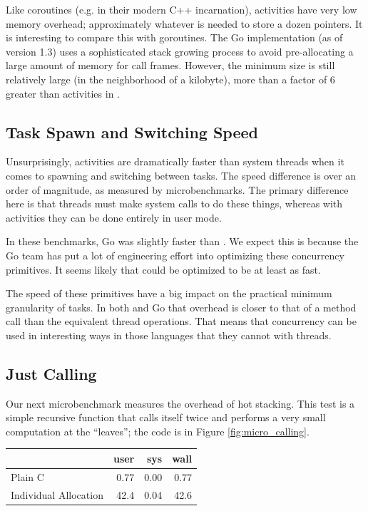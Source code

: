 \documentclass[acmsmall,anonymous,review]{acmart}\settopmatter{printfolios=true,printccs=false,printacmref=false}
\begin{document}
Like coroutines (e.g. in their modern C++ incarnation), activities have very low memory overhead; approximately whatever is needed to store a dozen pointers.
It is interesting to compare this with goroutines.
The Go implementation (as of version 1.3) uses a sophisticated stack growing process to avoid pre-allocating a large amount of memory for call frames.
However, the minimum size is still relatively large (in the neighborhood of a kilobyte), more than a factor of 6 greater than activities in \charcoal{}.

\subsection{Task Spawn and Switching Speed}

Unsurprisingly, activities are dramatically faster than system threads when it comes to spawning and switching between tasks.
The speed difference is over an order of magnitude, as measured by microbenchmarks.
The primary difference here is that threads must make system calls to do these things, whereas with activities they can be done entirely in user mode.

In these benchmarks, Go was slightly faster than \charcoal{}.
We expect this is because the Go team has put a lot of engineering effort into optimizing these concurrency primitives.
It seems likely that \charcoal{} could be optimized to be at least as fast.

The speed of these primitives have a big impact on the practical minimum granularity of tasks.
In both \charcoal{} and Go that overhead is closer to that of a method call than the equivalent thread operations.
That means that concurrency can be used in interesting ways in those languages that they cannot with threads.

\subsection{Just Calling}

Our next microbenchmark measures the overhead of hot stacking.
This test is a simple recursive function that calls itself twice and performs a very small computation at the ``leaves''; the code is in Figure \ref{fig:micro_calling}.

\vspace{1em}
\begin{tabular}{|l|r|r|r|}
  \hline
   & user & sys & wall \\
  \hline
  \hline
  Plain C & 0.77 & 0.00 & 0.77 \\
  \hline
  Individual Allocation & 42.4 & 0.04 & 42.6 \\
  \hline
\end{tabular}
\vspace{1em}
\end{document}
